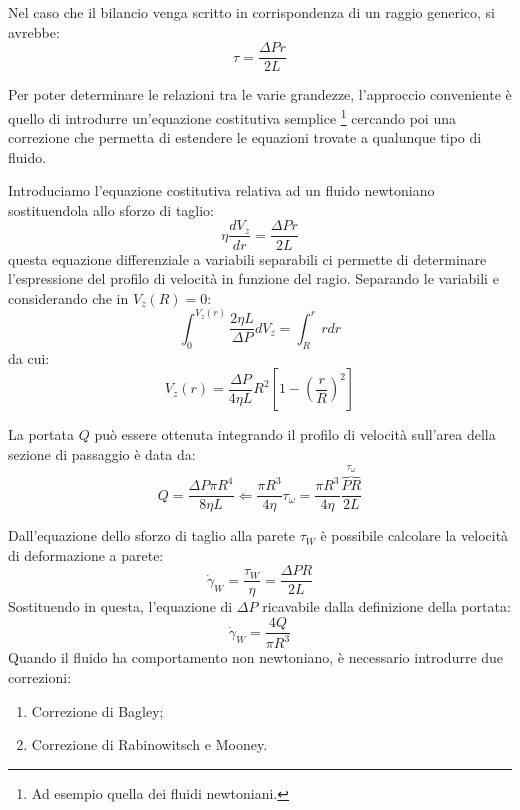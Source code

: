 Nel caso che il bilancio venga scritto in corrispondenza di un raggio generico, si avrebbe:
\begin{equation}
\tau = \frac{\Delta P r}{2 L}
\end{equation}

Per poter determinare le relazioni tra le varie grandezze, l'approccio conveniente è quello di introdurre un'equazione costitutiva semplice%
\footnote{Ad esempio quella dei fluidi newtoniani.}
cercando poi una correzione che permetta di estendere le equazioni trovate a qualunque tipo di fluido.

Introduciamo l'equazione costitutiva relativa ad un fluido newtoniano sostituendola allo sforzo di taglio:
\begin{equation}
\eta \frac{d V_z}{dr} = \frac{\Delta P r}{2 L}
\end{equation}
questa equazione differenziale a variabili separabili ci permette di determinare l'espressione del profilo di velocità in funzione del ragio. Separando le variabili e considerando che in $V_z(R) = 0$:
\begin{equation}
\int_0^{V_z(r)}{\frac{2\eta L}{\Delta P} dV_z} = \int_R^r rdr
\end{equation}
da cui:
\begin{equation}
V_z(r) = \frac{\Delta P}{4 \eta L} R^2 \left[1 - \left(\frac{r}{R}\right)^2\right] 
\end{equation}

La portata $Q$ può essere ottenuta integrando il profilo di velocità sull'area della sezione di passaggio è data da:
\begin{equation}
Q = \frac{\Delta P \pi R^4}{8 \eta L} \Leftarrow%
\frac{\pi R^3}{4 \eta} \tau_{\omega} =%
\frac{\pi R^3}{4 \eta} \frac{\overbrace{P R}^{\tau_{\omega}}}{2L}
\end{equation}

Dall'equazione dello sforzo di taglio alla parete $\tau_W$ è possibile calcolare la velocità di deformazione a parete:
\begin{equation}
\dot{\gamma}_W = \frac{\tau_W}{\eta} = \frac{\Delta P R}{2 L}
\end{equation}
Sostituendo in questa, l'equazione di $\Delta P$ ricavabile dalla definizione della portata:
\begin{equation}
\dot{\gamma}_W = \frac{4Q}{\pi R^3}
\end{equation}
Quando il fluido ha comportamento non newtoniano, è necessario introdurre due correzioni:
\begin{enumerate}
\item Correzione di Bagley;
\item Correzione di Rabinowitsch e Mooney.
\end{enumerate}

